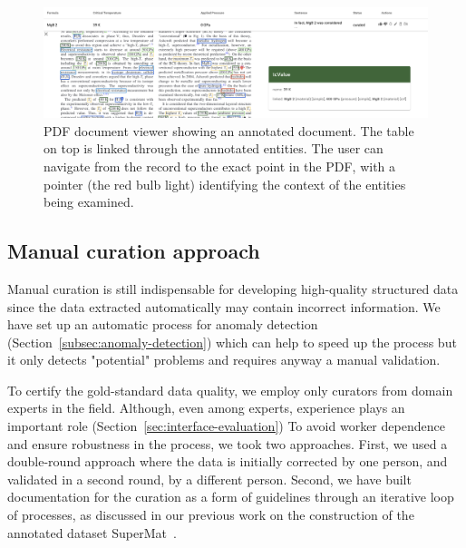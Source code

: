 \documentclass[a4paper]{article}
\begin{document}

\begin{figure}[ht]
  \centering
  \includegraphics[width=1\textwidth]{images/pdf-view-context.png} 
  \caption{PDF document viewer showing an annotated document. The table on top is linked through the annotated entities. The user can navigate from the record to the exact point in the PDF, with a pointer (the red bulb light) identifying the context of the entities being examined. }
  \label{fig:pdf-view}
\end{figure}



\subsection{Manual curation approach}
\label{sec:data-correction}
\label{subsec:manual_correction}

Manual curation is still indispensable for developing high-quality structured data since the data extracted automatically may contain incorrect information.
We have set up an automatic process for anomaly detection (Section~\ref{subsec:anomaly-detection}) which can help to speed up the process but it only detects "potential" problems and requires anyway a manual validation.

To certify the gold-standard data quality, we employ only curators from domain experts in the field. 
Although, even among experts, experience plays an important role (Section~\ref{sec:interface-evaluation})
To avoid worker dependence and ensure robustness in the process, we took two approaches. 
First, we used a double-round approach where the data is initially corrected by one person, and validated in a second round, by a different person. 
Second, we have built documentation for the curation as a form of guidelines through an iterative loop of processes, as discussed in our previous work on the construction of the annotated dataset SuperMat~\cite{foppiano2021supermat}. 
\end{document}
